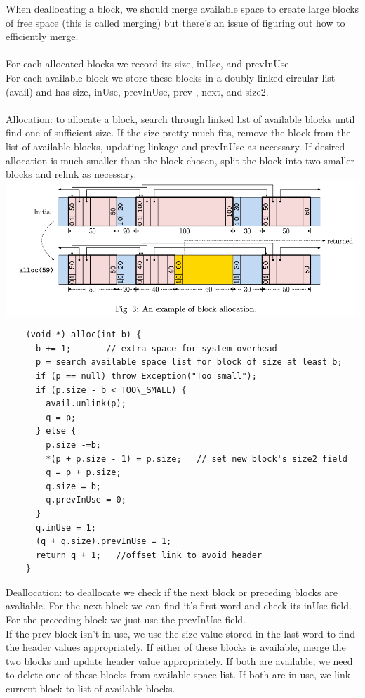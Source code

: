 \documentclass{article}
\begin{document}
  When deallocating a block, we should merge available space to create large blocks of free space (this is called merging) but there's an issue of figuring out how to efficiently merge.\\ \\
  For each allocated blocks we record its size, inUse, and prevInUse \\
  For each available block we store these blocks in a doubly-linked circular list (avail) and has size, inUse, prevInUse, prev , next, and size2. \\ \\
  Allocation: to allocate a block, search through linked list of available blocks until find one of sufficient size. If the size pretty much fits, remove the block from the list of available blocks, updating linkage and prevInUse as necessary. If desired allocation is much smaller than the block chosen, split the block into two smaller blocks and relink as necessary.\\
  \includegraphics[width=\textwidth]{MemoryAllocation}
  \newpage
  \begin{lstlisting}
    (void *) alloc(int b) {
      b += 1;       // extra space for system overhead
      p = search available space list for block of size at least b;
      if (p == null) throw Exception("Too small");
      if (p.size - b < TOO\_SMALL) {
        avail.unlink(p);
        q = p;
      } else {
        p.size -=b;
        *(p + p.size - 1) = p.size;   // set new block's size2 field
        q = p + p.size;
        q.size = b;
        q.prevInUse = 0;
      }
      q.inUse = 1;
      (q + q.size).prevInUse = 1;
      return q + 1;   //offset link to avoid header
    }
  \end{lstlisting}
  \newpage
  Deallocation: to deallocate we check if the next block or preceding blocks are avaliable. For the next block we can find it's first word and check its inUse field. For the preceding block we just use the prevInUse field. \\
  If the prev block isn't in use, we use the size value stored in the last word to find the header values appropriately. If either of these blocks is available, merge the two blocks and update header value appropriately. If both are available, we need to delete one of these blocks from available space list. If both are in-use, we link current block to list of available blocks.\\
\end{document}
